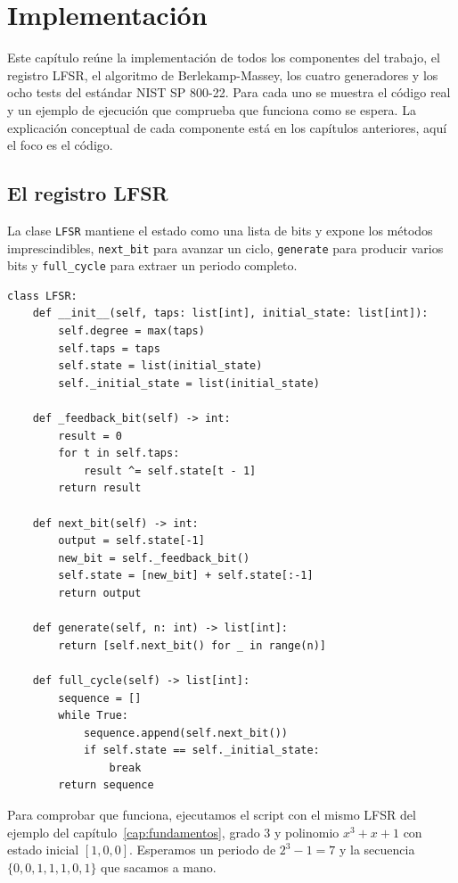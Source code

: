 \chapter{Implementación}
\label{cap:implementacion}

Este capítulo reúne la implementación de todos los componentes del trabajo, el registro LFSR, el algoritmo de Berlekamp-Massey,
los cuatro generadores y los ocho tests del estándar NIST SP 800-22. Para cada uno se muestra el código real
y un ejemplo de ejecución que comprueba que funciona como se espera. La explicación conceptual de cada componente
está en los capítulos anteriores, aquí el foco es el código.

\section{El registro LFSR}

La clase \texttt{LFSR} mantiene el estado como una lista de bits y expone los métodos imprescindibles, \texttt{next\_bit} para avanzar un ciclo,
\texttt{generate} para producir varios bits y \texttt{full\_cycle} para extraer un periodo completo.

\begin{lstlisting}[style=Python,caption={Núcleo de la clase LFSR (\texttt{src/lfsr.py}).}]
class LFSR:
    def __init__(self, taps: list[int], initial_state: list[int]):
        self.degree = max(taps)
        self.taps = taps
        self.state = list(initial_state)
        self._initial_state = list(initial_state)

    def _feedback_bit(self) -> int:
        result = 0
        for t in self.taps:
            result ^= self.state[t - 1]
        return result

    def next_bit(self) -> int:
        output = self.state[-1]
        new_bit = self._feedback_bit()
        self.state = [new_bit] + self.state[:-1]
        return output

    def generate(self, n: int) -> list[int]:
        return [self.next_bit() for _ in range(n)]

    def full_cycle(self) -> list[int]:
        sequence = []
        while True:
            sequence.append(self.next_bit())
            if self.state == self._initial_state:
                break
        return sequence
\end{lstlisting}

Para comprobar que funciona, ejecutamos el script con el mismo LFSR del ejemplo del capítulo~\ref{cap:fundamentos},
grado 3 y polinomio $x^3 + x + 1$ con estado inicial $[1, 0, 0]$.
Esperamos un periodo de $2^3 - 1 = 7$ y la secuencia $\{0, 0, 1, 1, 1, 0, 1\}$ que sacamos a mano.

